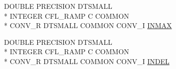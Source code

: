 \begin{DoxyCompactItemize}
D\-O\-U\-B\-L\-E P\-R\-E\-C\-I\-S\-I\-O\-N D\-T\-S\-M\-A\-L\-L \\*
I\-N\-T\-E\-G\-E\-R C\-F\-L\-\_\-\-R\-A\-M\-P C C\-O\-M\-M\-O\-N \\*
C\-O\-N\-V\-\_\-\-R D\-T\-S\-M\-A\-L\-L C\-O\-M\-M\-O\-N C\-O\-N\-V\-\_\-\-I \hyperlink{conv_8com_ae1a2f506c87687fe1a93649abac3846a}{I\-N\-M\-A\-X}
\item 
D\-O\-U\-B\-L\-E P\-R\-E\-C\-I\-S\-I\-O\-N D\-T\-S\-M\-A\-L\-L \\*
I\-N\-T\-E\-G\-E\-R C\-F\-L\-\_\-\-R\-A\-M\-P C C\-O\-M\-M\-O\-N \\*
C\-O\-N\-V\-\_\-\-R D\-T\-S\-M\-A\-L\-L C\-O\-M\-M\-O\-N C\-O\-N\-V\-\_\-\-I \hyperlink{conv_8com_af687d75faa87ba22ebd22f23d1d75cf2}{I\-N\-D\-E\-L}
\end{DoxyCompactItemize}


